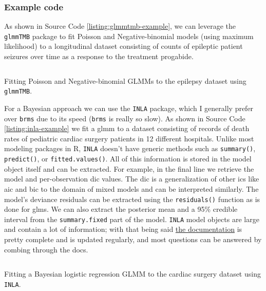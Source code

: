 \documentclass{report}
\begin{document}
\subsubsection{Example code}

As shown in Source Code \ref{listing:glmmtmb-example}, we can leverage the \texttt{glmmTMB} package to fit Poisson and Negative-binomial models (using maximum likelihood) to a longitudinal dataset consisting of counts of epileptic patient seizures over time as a response to the treatment progabide. 

\begin{listing}[h!]
\inputminted{r}{Example-Code/glmmtmb_count_regression.R}
\caption{Fitting Poisson and Negative-binomial GLMMs to the epilepsy dataset using \texttt{glmmTMB}.}
\label{listing:glmmtmb-example}
\end{listing}

For a Bayesian approach we can use the \texttt{INLA} package, which I generally prefer over \texttt{brms} due to its speed (\texttt{brms} is really so slow). As shown in Source Code \ref{listing:inla-example} we fit a \gls{glmm} to a dataset consisting of records of death rates of pediatric cardiac surgery patients in 12 different hospitals. Unlike most modeling packages in R, \texttt{INLA} doesn't have generic methods such as \texttt{summary()}, \texttt{predict()}, or \texttt{fitted.values()}. All of this information is stored in the model object itself and can be extracted. For example, in the final line we retrieve the model and per-observation \gls{dic} values. The \gls{dic} is a generalization of other \glspl{ic} like \gls{aic} and \gls{bic} to the domain of mixed models and can be interpreted similarly. The model's deviance residuals can be extracted using the \texttt{residuals()} function as is done for \glspl{glm}. We can also extract the posterior mean and a 95\% credible interval from the \texttt{summary.fixed} part of the model. \texttt{INLA} model objects are large and contain a lot of information; with that being said \href{https://www.r-inla.org/documentation}{the documentation} is pretty complete and is updated regularly, and most questions can be answered by combing through the docs. 

\begin{listing}[h!]
\inputminted{r}{Example-Code/inla_binomial_regression.R}
\caption{Fitting a Bayesian logistic regression GLMM to the cardiac surgery dataset using \texttt{INLA}.}
\label{listing:inla-example}
\end{listing}
\end{document}
